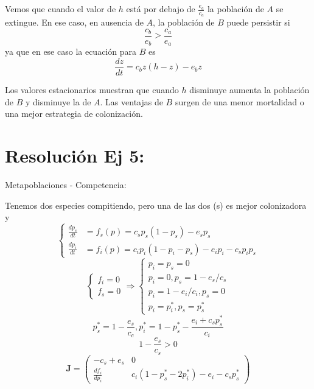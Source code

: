 \documentclass[twocolumn,aps,prl]{revtex4-1}
\begin{document}
Vemos que cuando el valor de $h$ está por debajo de $\frac{e_{a}}{c_{a}}$ la población de $A$ se extingue. En ese caso, en ausencia de $A$, la población de $B$ puede persistir si
$$
\frac{c_{b}}{e_{b}}>\frac{c_{a}}{e_{a}}
$$
ya que en ese caso la ecuación para $B$ es
$$
\frac{d z}{d t} = c_{b} z \left( h - z \right) - e_{b} z
$$

Los valores estacionarios muestran que cuando $h$ disminuye aumenta la población de $B$ y disminuye la de $A$. Las ventajas de $B$ surgen de una menor mortalidad o una mejor estrategia de colonización.

% 
%                             
% 

\section{Resolución Ej 5:}

Metapoblaciones - Competencia:

Tenemos dos especies compitiendo, pero una de las dos (s) es mejor colonizadora y
$$
\left\{
\begin{aligned}
    \frac{d p_{s}}{d t} &=f_{s}(p)=c_{s} p_{s}\left(1-p_{s}\right)-e_{s} p_{s} \\ 
    \frac{d p_{i}}{d t} &=f_{i}(p)=c_{i} p_{i}\left(1-p_{i}-p_{s}\right)-e_{i} p_{i}-c_{s} p_{i} p_{s}
\end{aligned} 
\right.
$$
$$
\left\{
\begin{array} { l } 
    { f _ { i } = 0 } \\
    { f _ { s } = 0 }
\end{array} 
\right. 
\Rightarrow 
\left\{
\begin{array}{l}
    p_{i}=p_{s}=0 \\
    p_{i}=0, p_{s}=1-e_{s} / c_{s} \\
    p_{i}=1-e_{i} / c_{i}, p_{s}=0 \\
    p_{i}=p_{i}^{*}, p_{s}=p_{s}^{*}
\end{array}
\right.
$$
$$
p_{s}^{*}=1-\frac{e_{s}}{c_{c}}, p_{i}^{*}=1-p_{s}^{*}-\frac{e_{i}+c_{s} p_{s}^{*}}{c_{i}}
$$
$$
1 - \frac{e_{s}}{c_{s}} > 0
$$
\begin{equation}
    \mathbf{J}=\left(
    \begin{array}{cc}
        -c_{s}+e_{s} & 0 \\
        \frac{d f_{i}}{d p_{i}} & c_{i}\left(1-p_{s}^{*}-2 p_{i}^{*}\right)-e_{i}-c_{s} p_{s}^{*}
    \end{array}
    \right)
\end{equation}
\end{document}
